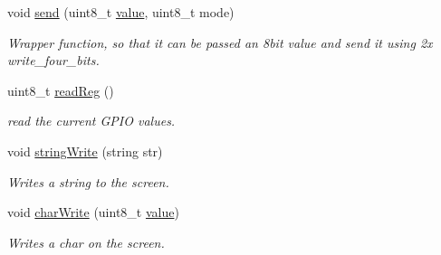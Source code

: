 \begin{DoxyCompactItemize}
void \hyperlink{class_l_c_d_ac740e9489fdff4f2f40fab32146e5562}{send} (uint8\+\_\+t \hyperlink{button__drv_8c_ac4f474c82e82cbb89ca7c36dd52be0ed}{value}, uint8\+\_\+t mode)
\begin{DoxyCompactList}\small\item\em Wrapper function, so that it can be passed an 8bit value and send it using 2x write\+\_\+four\+\_\+bits. \end{DoxyCompactList}\item 
uint8\+\_\+t \hyperlink{class_l_c_d_a7ee8acb9ba87f391991d6fa6c5ac861a}{read\+Reg} ()
\begin{DoxyCompactList}\small\item\em read the current G\+P\+IO values. \end{DoxyCompactList}\item 
void \hyperlink{class_l_c_d_aa6838b75ba35ad177394599e11bc38d1}{string\+Write} (string str)
\begin{DoxyCompactList}\small\item\em Writes a string to the screen. \end{DoxyCompactList}\item 
void \hyperlink{class_l_c_d_a2a7ee75f1a8fd2fb6f812ab7c60dc487}{char\+Write} (uint8\+\_\+t \hyperlink{button__drv_8c_ac4f474c82e82cbb89ca7c36dd52be0ed}{value})
\begin{DoxyCompactList}\small\item\em Writes a char on the screen. \end{DoxyCompactList}\end{DoxyCompactItemize}
